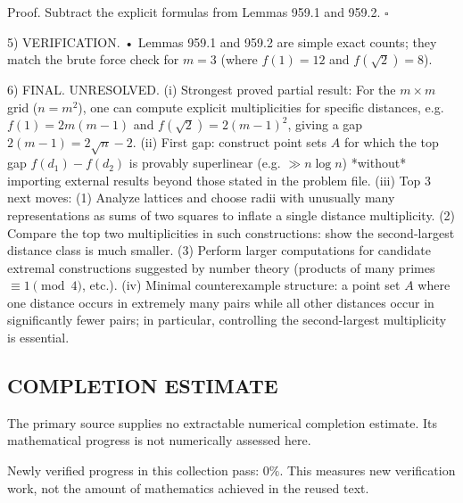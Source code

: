 Proof.
Subtract the explicit formulas from Lemmas 959.1 and 959.2.
\hfill $\square$

5) VERIFICATION.
• Lemmas 959.1 and 959.2 are simple exact counts; they match the brute force check for $m=3$ (where $f(1)=12$ and $f(\sqrt{2})=8$).

6) FINAL.
UNRESOLVED.
(i) Strongest proved partial result: For the $m\times m$ grid ($n=m^2$), one can compute explicit multiplicities for specific distances, e.g. $f(1)=2m(m-1)$ and $f(\sqrt{2})=2(m-1)^2$, giving a gap $2(m-1)=2\sqrt{n}-2$.
(ii) First gap: construct point sets $A$ for which the top gap $f(d_1)-f(d_2)$ is provably superlinear (e.g. $\gg n\log n$) *without* importing external results beyond those stated in the problem file.
(iii) Top 3 next moves:
  (1) Analyze lattices and choose radii with unusually many representations as sums of two squares to inflate a single distance multiplicity.
  (2) Compare the top two multiplicities in such constructions: show the second-largest distance class is much smaller.
  (3) Perform larger computations for candidate extremal constructions suggested by number theory (products of many primes $\equiv 1\pmod 4$, etc.).
(iv) Minimal counterexample structure: a point set $A$ where one distance occurs in extremely many pairs while all other distances occur in significantly fewer pairs; in particular, controlling the second-largest multiplicity is essential.




\subsection*{COMPLETION ESTIMATE}
The primary source supplies no extractable numerical completion estimate. Its mathematical progress is not numerically assessed here.

Newly verified progress in this collection pass: $0\%$. This measures new verification work, not the amount of mathematics achieved in the reused text.
